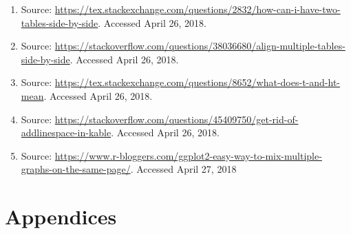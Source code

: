 \documentclass[]{article}
\begin{document}
\begin{enumerate}
\def\labelenumi{\arabic{enumi})}
\item
  Source:
  \url{https://tex.stackexchange.com/questions/2832/how-can-i-have-two-tables-side-by-side}.
  Accessed April 26, 2018.
\item
  Source:
  \url{https://stackoverflow.com/questions/38036680/align-multiple-tables-side-by-side}.
  Accessed April 26, 2018.
\item
  Source:
  \url{https://tex.stackexchange.com/questions/8652/what-does-t-and-ht-mean}.
  Accessed April 26, 2018.
\item
  Source:
  \url{https://stackoverflow.com/questions/45409750/get-rid-of-addlinespace-in-kable}.
  Accessed April 26, 2018.
\item
  Source:
  \url{https://www.r-bloggers.com/ggplot2-easy-way-to-mix-multiple-graphs-on-the-same-page/}.
  Accessed April 27, 2018
\end{enumerate}

\section{Appendices}\label{appendices}

\subsection{\texorpdfstring{\label{appendix:known.vars}}{}}\label{section}
\end{document}
